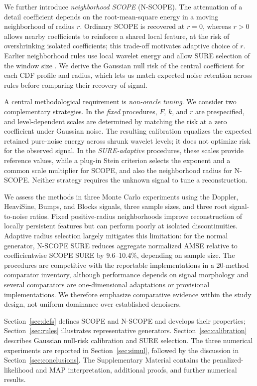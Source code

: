 \documentclass[12pt]{article}
\theoremstyle{definition}
\theoremstyle{definition}
\begin{document}
We further introduce \emph{neighborhood SCOPE} (N-SCOPE). The
attenuation of a detail coefficient depends on the root-mean-square
energy in a moving neighborhood of radius $r$. Ordinary SCOPE is
recovered at $r=0$, whereas $r>0$ allows nearby coefficients to
reinforce a shared local feature, at the risk of overshrinking isolated
coefficients; this trade-off motivates adaptive choice of $r$. Earlier
neighborhood rules use local wavelet energy \citep{CaiSilverman2001Neigh}
and allow SURE selection of the window size
\citep{ZhouCheng2008NeighShrinkSURE}. We derive the Gaussian null risk
of the central coefficient for each CDF profile and radius, which lets
us match expected noise retention across rules before comparing their
recovery of signal.

A central methodological requirement is \emph{non-oracle tuning}.
We consider two complementary strategies. In the \emph{fixed}
procedures, $F$, $k$, and $r$ are prespecified, and level-dependent
scales are determined by matching the risk at a zero coefficient under
Gaussian noise. The resulting calibration equalizes the expected
retained pure-noise energy across shrunk wavelet levels; it does not
optimize risk for the observed signal. In the \emph{SURE-adaptive}
procedures, these scales provide reference values, while a plug-in
Stein criterion selects the exponent and a common scale multiplier
for SCOPE, and also the neighborhood radius for N-SCOPE. Neither
strategy requires the unknown signal to tune a reconstruction.

We assess the methods in three Monte Carlo experiments using the
Doppler, HeaviSine, Bumps, and Blocks signals, three sample sizes,
and three root signal-to-noise ratios. Fixed positive-radius
neighborhoods improve reconstruction of locally persistent features
but can perform poorly at isolated discontinuities. Adaptive radius
selection largely mitigates this limitation: for the normal generator,
N-SCOPE SURE reduces aggregate normalized AMSE relative to
coefficientwise SCOPE SURE by 9.6--10.4\%, depending on sample size.
The procedures are competitive with the reportable implementations
in a 20-method comparator inventory, although performance depends
on signal morphology and several comparators are one-dimensional
adaptations or provisional implementations. We therefore emphasize
comparative evidence within the study design, not uniform dominance
over established denoisers.

Section~\ref{sec:defs} defines SCOPE and N-SCOPE and develops their
properties; Section~\ref{sec:rules} illustrates representative
generators. Section~\ref{sec:calibration} describes Gaussian null-risk
calibration and SURE selection. The three numerical experiments are
reported in Section~\ref{sec:simul}, followed by the discussion in
Section~\ref{sec:conclusions}. The Supplementary Material contains
the penalized-likelihood and MAP interpretation, additional proofs,
and further numerical results.
\end{document}
